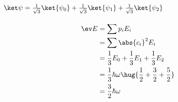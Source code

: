 \documentclass[ex]{exercise}
\begin{document}
\subsection{\(\ket\psi = \frac1{\sqrt3}\ket{\psi_0} + \frac1{\sqrt3} \ket{\psi_1}+ \frac1{\sqrt3} \ket{\psi_2}\)}
\begin{align*}
    \ev E &= \sum p_i E_i\\
    &= \sum \abs{c_i}^2 E_i\\
    &=  \frac13 E_0 + \frac13 E_1 + \frac13 E_2\\
    &=  \frac13 \hbar\omega \hug{\frac12 + \frac32 + \frac52}\\
    &=  \frac32 \hbar \omega
\end{align*}
\end{document}
